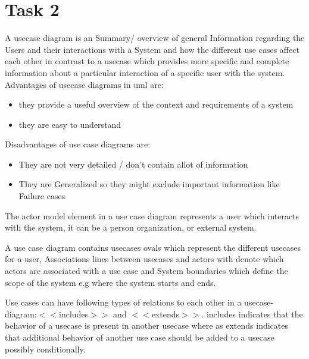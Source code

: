 \chapter{Task 2}
\begin{parlist}
\item A usecase diagram is an Summary/ overview of general Information regarding the Users and their interactions with a System and how the different use cases affect each other in contrast to a usecase which provides more specific and complete information about a particular interaction of a specific user with the system.\cite{lucidchartCaseDiagramm}\\
Advantages of usecase diagrams in uml are:
\begin{itemize}
	\item  they provide a useful overview of the context and requirements of a system
	\item they are easy to understand
\end{itemize}
Disadvantages of use case diagrams are:
\begin{itemize}
	\item They are not very detailed / don't contain allot of information
	\item They are Generalized so they might exclude important information like Failure cases
\end{itemize}
\item The actor model element in a use case diagram represents a user which interacts with the system, it can be a person organization, or external system.

\item A use case diagram contains usecases ovals which represent the different usecases for a user, Associations lines between usecases and actors with denote which actors are associated with a use case and System boundaries which define the scope of the system e.g where the system starts and ends.

\item Use cases can have following types of relations to each other in a usecase-diagram:$<<$includes$>>$
and $<<$extends$>>$. includes indicates that the behavior of a usecase is present in another usecase where as extends indicates that additional behavior of another use case should be added to a usecase possibly conditionally.

\end{parlist}
